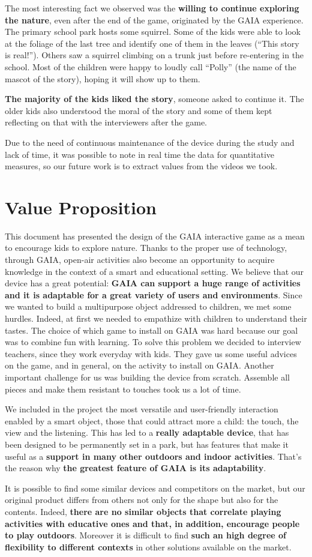 \documentclass[a4paper,11pt]{report}
\begin{document}
The most interesting fact we observed was the \textbf{willing to continue exploring the nature}, even after the end of the game, originated by the GAIA experience. The primary school park hosts some squirrel. Some of the kids were able to look at the foliage of the last tree and identify one of them in the leaves (“This story is real!”). Others saw a squirrel climbing on a trunk just before re-entering in the school. Most of the children were happy to loudly call “Polly” (the name of the mascot of the story), hoping it will show up to them.\par 
\textbf{The majority of the kids liked the story}, someone asked to continue it. The older kids also understood the moral of the story and some of them kept reflecting on that with the interviewers after the game.\par
Due to the need of continuous maintenance of the device during the study and lack of time, it was possible to note in real time the data for quantitative measures, so our future work is to extract values from the videos we took.
\chapter{Value Proposition}
This document has presented the design of the GAIA interactive game as a mean to encourage kids to explore nature. Thanks to the proper use of technology, through GAIA, open-air activities also become an opportunity to acquire knowledge in the context of a smart and educational setting.  We believe that our device has a great potential: \textbf{GAIA can support a huge range of activities and it is adaptable for a great variety of users and environments}. Since we wanted to build a multipurpose object addressed to children, we met some hurdles. Indeed, at first we needed to empathize with children to understand their tastes. The choice of which game to install on GAIA was hard because our goal was to combine fun with learning. To solve this problem we decided to interview teachers, since they work everyday with kids. They gave us some useful advices on the game, and in general, on the activity to install on GAIA. Another important challenge for us was building the device from scratch. Assemble all pieces and make them resistant to touches took us a lot of time. \par
We included in the project the most versatile and user-friendly interaction enabled by a smart object, those that could attract more a child: the touch, the view and the listening. This has led to a \textbf{really adaptable device}, that has been designed to be permanently set in a park, but has features that make it useful as a \textbf{support in many other outdoors and indoor activities}. That’s the reason why \textbf{the greatest feature of GAIA is its adaptability}.\par
It is possible to find some similar devices and competitors on the market, but our original product differs from others not only for the shape but also for the contents. Indeed, \textbf{there are no similar objects that correlate playing activities with educative ones and that, in addition, encourage people to play outdoors}. Moreover it is difficult to find \textbf{such an high degree of flexibility to different contexts} in other solutions available on the market.
\end{document}
